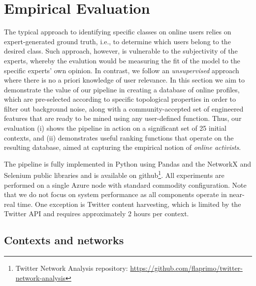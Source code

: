 \section{Empirical Evaluation} \label{sec:evaluation}

The typical approach to identifying specific classes on online users relies on expert-generated ground truth, i.e., to determine which users belong to the desired class. 
Such approach, however, is vulnerable to  the subjectivity of the experts, whereby the evalution would  be measuring the fit of the model to the specific experts' own opinion. 
In contrast, we follow an \textit{unsupervised} approach where there is no a priori knowledge of user relevance.  
In this section we aim to demonstrate the value of our pipeline in creating a database of online profiles, which are pre-selected according to specific topological properties in order to filter out background noise,  along with a community-accepted set of engineered features that are ready to be mined using any user-defined function.
%
Thus, our evaluation (i) shows the pipeline in action on a significant set of 25 initial contexts, and (ii) demonstrates useful ranking functions that operate on the resulting database, aimed at capturing the empirical notion of  \textit{online activists}.

The pipeline is fully implemented in Python using Pandas and the NetworkX and Selenium public libraries and is available on github\footnote{Twitter Network Analysis repository: \url{https://github.com/flaprimo/twitter-network-analysis}}. 
All experiments are performed on a single Azure node with standard commodity configuration.
Note that we do not focus on system performance as all components operate in near-real time. One exception is  Twitter content harvesting, which is limited by the Twitter API and requires approximately 2 hours per context.

\subsection{Contexts and networks} \label{sec:contexts}
 
